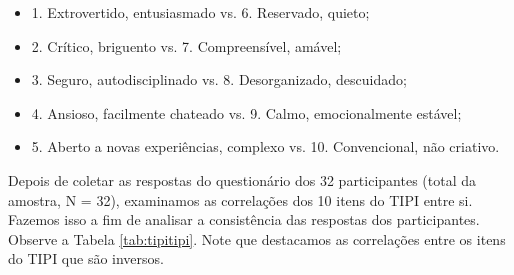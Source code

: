 \begin{itemize}
\item 1. Extrovertido, entusiasmado vs. 6. Reservado, quieto;
\item 2. Crítico, briguento vs. 7. Compreensível, amável;
\item 3. Seguro, autodisciplinado vs. 8. Desorganizado, descuidado;
\item 4. Ansioso, facilmente chateado vs. 9. Calmo, emocionalmente estável;
\item 5. Aberto a novas experiências, complexo vs. 10. Convencional, não criativo.
\end{itemize}

Depois de coletar as respostas do questionário dos 32 participantes (total da amostra, N = 32),
examinamos as correlações dos 10 itens do TIPI entre si.
Fazemos isso a fim de analisar a consistência das respostas dos participantes. Observe a Tabela \ref{tab:tipitipi}.
Note que destacamos as correlações entre os itens do TIPI que são inversos. 

